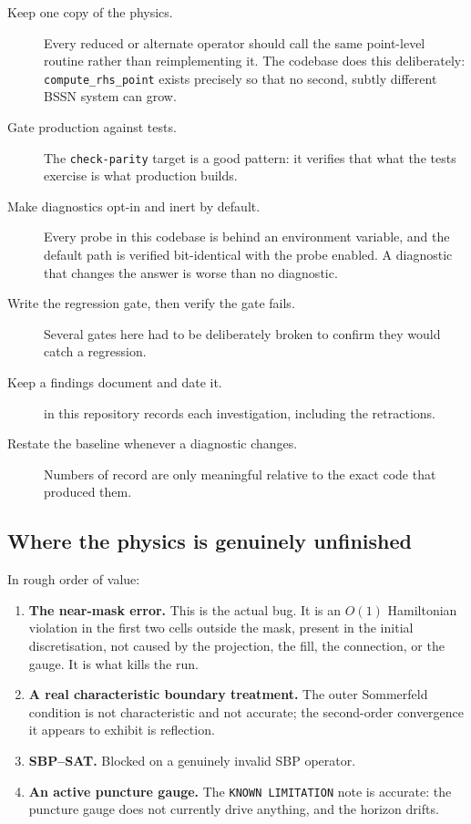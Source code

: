 \begin{description}
\item[Keep one copy of the physics.] Every reduced or alternate operator should
      call the same point-level routine rather than reimplementing it. The
      codebase does this deliberately: \texttt{compute\_rhs\_point} exists
      precisely so that no second, subtly different BSSN system can grow.
\item[Gate production against tests.] The \texttt{check-parity} target is a
      good pattern: it verifies that what the tests exercise is what production
      builds.
\item[Make diagnostics opt-in and inert by default.] Every probe in this
      codebase is behind an environment variable, and the default path is
      verified bit-identical with the probe enabled. A diagnostic that changes
      the answer is worse than no diagnostic.
\item[Write the regression gate, then verify the gate fails.] Several gates
      here had to be deliberately broken to confirm they would catch a
      regression.
\item[Keep a findings document and date it.]  in this
      repository records each investigation, including the retractions.
\item[Restate the baseline whenever a diagnostic changes.] Numbers of record
      are only meaningful relative to the exact code that produced them.
\end{description}

\subsection{Where the physics is genuinely unfinished}

In rough order of value:

\begin{enumerate}
\item \textbf{The near-mask error.} This is the actual bug. It is an $O(1)$
      Hamiltonian violation in the first two cells outside the mask, present in
      the initial discretisation, not caused by the projection, the fill, the
      connection, or the gauge. It is what kills the run.
\item \textbf{A real characteristic boundary treatment.} The outer Sommerfeld
      condition is not characteristic and not accurate; the second-order
      convergence it appears to exhibit is reflection.
\item \textbf{SBP--SAT.} Blocked on a genuinely invalid SBP operator.
\item \textbf{An active puncture gauge.} The \texttt{KNOWN LIMITATION} note
      is accurate: the puncture gauge does not currently drive anything, and
      the horizon drifts.
\end{enumerate}

